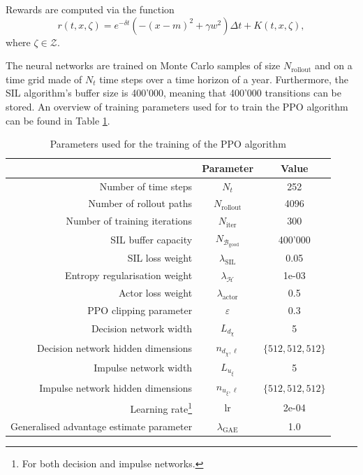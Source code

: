 Rewards are computed via the function
\begin{equation*}
    r(t,x,\zeta) = e^{-\delta t} \left(-(x-m)^2 + \gamma w^2 \right) \Delta t + K(t,x,\zeta),
\end{equation*}
where $\zeta \in \mathcal Z$.

The neural networks are trained on Monte Carlo samples of size $N_{\text{rollout}}$ and on a time grid made of $N_t$ time steps over a time horizon of a year. Furthermore, the SIL algorithm's buffer size is 400'000, meaning that 400'000 transitions can be stored. An overview of training parameters used for to train the PPO algorithm can be found in Table \ref{tab: PPO training parameters}.

\begin{table}[h]
    \centering
    \begin{tabular}{rcc}
        \toprule
        & Parameter & Value \\
        \hline
        Number of time steps & $N_t$ & 252 \\
        Number of rollout paths & $N_\text{rollout}$ & 4096 \\
        Number of training iterations & $N_\text{iter}$ & 300 \\
        SIL buffer capacity & $N_{\mathcal{B}_\text{good}}$ & 400'000 \\
        SIL loss weight & $\lambda_{\text{SIL}}$ & 0.05 \\
        Entropy regularisation weight & $\lambda_{\mathcal{H}}$ & 1e-03 \\
        Actor loss weight & $\lambda_{\text{actor}}$ & 0.5 \\
        PPO clipping parameter & $\varepsilon$ & 0.3 \\
        Decision network width & $L_{d_\chi}$ & 5 \\
        Decision network hidden dimensions & $n_{d_\chi, \ell}$ & $\{512, 512, 512\}$ \\
        Impulse network width & $L_{u_\xi}$ & 5 \\
        Impulse network hidden dimensions & $n_{u_\xi, \ell}$ & $\{512, 512, 512\}$ \\
        Learning rate\footnote{For both decision and impulse networks.} & lr & 2e-04 \\
        Generalised advantage estimate parameter & $\lambda_\text{GAE}$ & 1.0\\
        \toprule
    \end{tabular}
    \caption{Parameters used for the training of the PPO algorithm}
    \label{tab: PPO training parameters}
\end{table}

